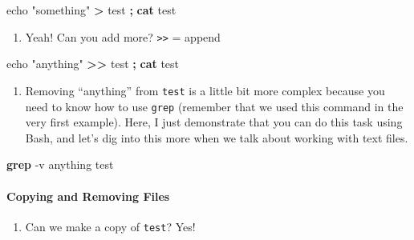 \documentclass[
]{book}
\newenvironment{Shaded}{\begin{snugshade}}{\end{snugshade}}
\newcommand{\AttributeTok}[1]{\textcolor[rgb]{0.13,0.29,0.53}{#1}}
\newcommand{\BuiltInTok}[1]{#1}
\newcommand{\FunctionTok}[1]{\textcolor[rgb]{0.13,0.29,0.53}{\textbf{#1}}}
\newcommand{\KeywordTok}[1]{\textcolor[rgb]{0.13,0.29,0.53}{\textbf{#1}}}
\newcommand{\NormalTok}[1]{#1}
\newcommand{\OperatorTok}[1]{\textcolor[rgb]{0.81,0.36,0.00}{\textbf{#1}}}
\newcommand{\StringTok}[1]{\textcolor[rgb]{0.31,0.60,0.02}{#1}}
\providecommand{\tightlist}{%
  \setlength{\itemsep}{0pt}\setlength{\parskip}{0pt}}
\begin{document}
\begin{Shaded}
\begin{Highlighting}[]

\BuiltInTok{echo} \StringTok{"something"} \OperatorTok{\textgreater{}}\NormalTok{ test }\KeywordTok{;} \FunctionTok{cat}\NormalTok{ test}
\end{Highlighting}
\end{Shaded}

\begin{enumerate}
\def\labelenumi{\arabic{enumi}.}
\setcounter{enumi}{5}
\tightlist
\item
  Yeah! Can you add more? \texttt{\textgreater{}\textgreater{}} = append
\end{enumerate}

\begin{Shaded}
\begin{Highlighting}[]

\BuiltInTok{echo} \StringTok{"anything"} \OperatorTok{\textgreater{}\textgreater{}}\NormalTok{ test }\KeywordTok{;} \FunctionTok{cat}\NormalTok{ test}
\end{Highlighting}
\end{Shaded}

\begin{enumerate}
\def\labelenumi{\arabic{enumi}.}
\setcounter{enumi}{6}
\tightlist
\item
  Removing ``anything'' from \texttt{test} is a little bit more complex because you need to know how to use \texttt{grep} (remember that we used this command in the very first example). Here, I just demonstrate that you can do this task using Bash, and let's dig into this more when we talk about working with text files.
\end{enumerate}

\begin{Shaded}
\begin{Highlighting}[]

\FunctionTok{grep} \AttributeTok{{-}v} \StringTok{\textquotesingle{}anything\textquotesingle{}}\NormalTok{ test}
\end{Highlighting}
\end{Shaded}

\paragraph{Copying and Removing Files}\label{copying-and-removing-files}

\begin{enumerate}
\def\labelenumi{\arabic{enumi}.}
\tightlist
\item
  Can we make a copy of \texttt{test}? Yes!
\end{enumerate}
\end{document}
